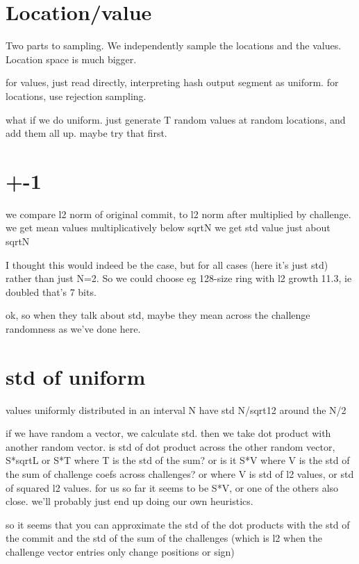 


\section{Location/value}

Two parts to sampling.
We independently sample the locations and the values.
Location space is much bigger.

for values, just read directly, interpreting hash output segment as uniform.
for locations, use rejection sampling.

what if we do uniform. just generate T random values at random locations, and add them all up.
maybe try that first. 



\section{+-1}
we compare l2 norm of original commit, to l2 norm after multiplied by challenge.
we get mean values multiplicatively below sqrt{N}
we get std value just about sqrt{N}

I thought this would indeed be the case, but for all cases (here it's just std) rather than just N=2.
So we could choose eg 128-size ring with l2 growth 11.3, ie doubled that's 7 bits.

ok, so when they talk about std, maybe they mean across the challenge randomness as we've done here.



\section{std of uniform}
values uniformly distributed in an interval N
have std N/sqrt{12} around the N/2




if we have random a vector, we calculate std.
then we take dot product with another random vector.
is std of dot product across the other random vector, S*sqrt{L} or S*T where T is the std of the sum?
or is it S*V where V is the std of the sum of challenge coefs across challenges?
or where V is std of l2 values, or std of squared l2 values.
for us so far it seems to be S*V, or one of the others also close.
we'll probably just end up doing our own heuristics.

so it seems that you can approximate the std of the dot products with the std of the commit and the std of the sum of the challenges (which is l2 when the challenge vector entries only change positions or sign)

